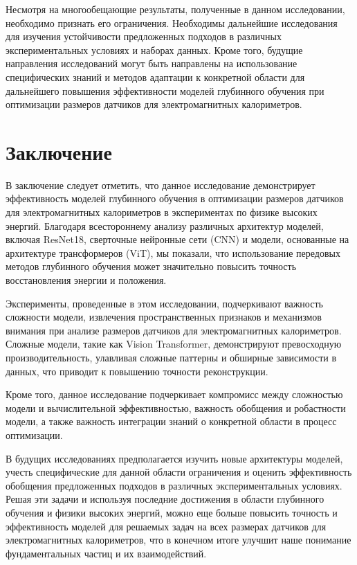 \documentclass[a4paper,12pt]{extarticle}
\begin{document}
Несмотря на многообещающие результаты, полученные в данном исследовании, необходимо признать его ограничения. Необходимы дальнейшие исследования для изучения устойчивости предложенных подходов в различных экспериментальных условиях и наборах данных. Кроме того, будущие направления исследований могут быть направлены на использование специфических знаний и методов адаптации к конкретной области для дальнейшего повышения эффективности моделей глубинного обучения при оптимизации размеров датчиков для электромагнитных калориметров.

\newpage

\section{Заключение}
\label{section:conclusion}

В заключение следует отметить, что данное исследование демонстрирует эффективность моделей глубинного обучения в оптимизации размеров датчиков для электромагнитных калориметров в экспериментах по физике высоких энергий. Благодаря всестороннему анализу различных архитектур моделей, включая \textsf{ResNet18}, сверточные нейронные сети (\textsf{CNN}) и модели, основанные на архитектуре трансформеров (\textsf{ViT}), мы показали, что использование передовых методов глубинного обучения может значительно повысить точность восстановления энергии и положения.

Эксперименты, проведенные в этом исследовании, подчеркивают важность сложности модели, извлечения пространственных признаков и механизмов внимания при анализе размеров датчиков для электромагнитных калориметров. Сложные модели, такие как Vision Transformer, демонстрируют превосходную производительность, улавливая сложные паттерны и обширные зависимости в данных, что приводит к повышению точности реконструкции.

Кроме того, данное исследование подчеркивает компромисс между сложностью модели и вычислительной эффективностью, важность обобщения и робастности модели, а также важность интеграции знаний о конкретной области в процесс оптимизации.

В будущих исследованиях предполагается изучить новые архитектуры моделей, учесть специфические для данной области ограничения и оценить эффективность обобщения предложенных подходов в различных экспериментальных условиях. Решая эти задачи и используя последние достижения в области глубинного обучения и физики высоких энергий, можно еще больше повысить точность и эффективность моделей для решаемых задач на всех размерах датчиков для электромагнитных калориметров, что в конечном итоге улучшит наше понимание фундаментальных частиц и их взаимодействий.
\end{document}
